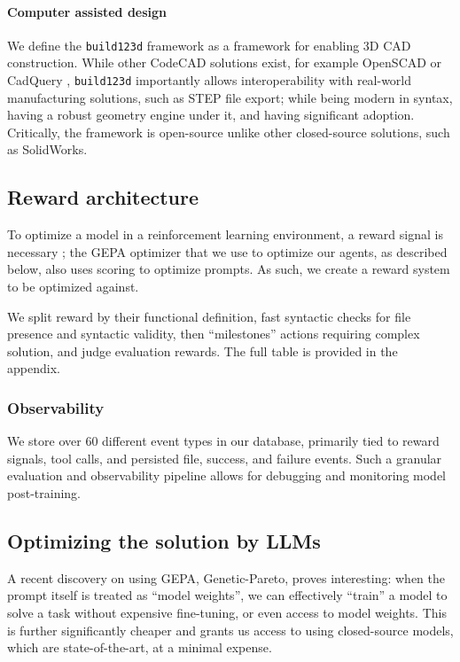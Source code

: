 \documentclass[conference]{IEEEtran}
\begin{document}
\paragraph{Computer assisted design}
We define the \texttt{build123d} framework as a framework for enabling 3D CAD construction. While other CodeCAD solutions exist, for example OpenSCAD \cite{ref5} or CadQuery \cite{ref6}, \texttt{build123d} importantly allows interoperability with real-world manufacturing solutions, such as STEP file export; while being modern in syntax, having a robust geometry engine under it, and having significant adoption. Critically, the framework is open-source unlike other closed-source solutions, such as SolidWorks.

\subsection{Reward architecture}
To optimize a model in a reinforcement learning environment, a reward signal is necessary \cite{ref1}; the GEPA optimizer that we use to optimize our agents, as described below, also uses scoring to optimize prompts. As such, we create a reward system to be optimized against.

We split reward by their functional definition, fast syntactic checks for file presence and syntactic validity, then ``milestones'' actions requiring complex solution, and judge evaluation rewards. The full table is provided in the appendix.

\subsubsection{Observability}
We store over 60 different event types in our database, primarily tied to reward signals, tool calls, and persisted file, success, and failure events. Such a granular evaluation and observability pipeline allows for debugging and monitoring model post-training.

\subsection{Optimizing the solution by LLMs}
A recent discovery on using GEPA, Genetic-Pareto, proves interesting: when the prompt itself is treated as ``model weights'', we can effectively ``train'' a model to solve a task without expensive fine-tuning, or even access to model weights. This is further significantly cheaper and grants us access to using closed-source models, which are state-of-the-art, at a minimal expense.
\end{document}
